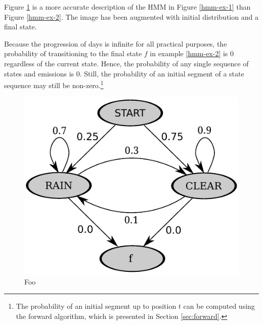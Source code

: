 Figure \ref{hmm-ex-3} is a more accurate description of the HMM in
Figure \ref{hmm-ex-1} than Figure \ref{hmm-ex-2}. The image has been
augmented with initial distribution and a final state. 

Because the progression of days is infinite for all practical purposes, the
probability of transitioning to the final state $f$ in example
\ref{hmm-ex-2} is 0 regardless of the current state. Hence, the
probability of any single sequence of states and emissions is
0. Still, the probability of an initial segment of a state sequence
may still be non-zero.\footnote{The probability of an initial segment
  up to position $t$ can be computed using the forward algorithm,
  which is presented in Section \ref{sec:forward}.}%

\begin{figure}[!htb]
\begin{center}
\caption{Foo}\label{hmm-ex-3}
\includegraphics[scale=0.8]{hmm-ex-graph-2}
\end{center}
\end{figure}

